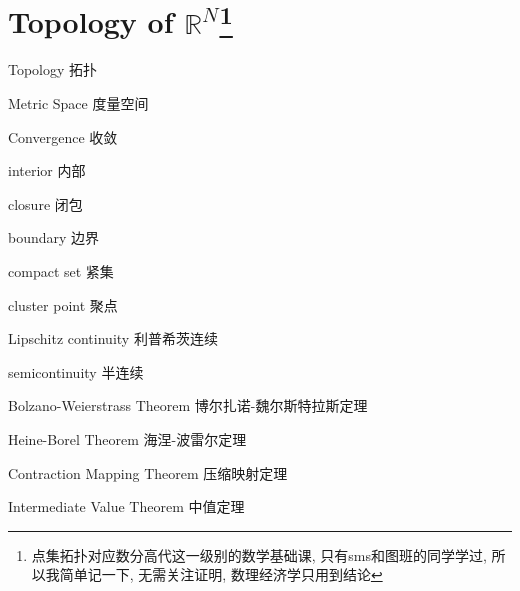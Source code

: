 \begin{comment}
    

\documentclass[lang=cn,10pt,green]{elegantbook} 
\title{2025年数理经济学笔记}
\subtitle{授课: 杨佳楠老师}

\author{徐靖}
\institute{PKU}
\date{Febuary 27, 2025}
\bioinfo{声明}{请勿用于个人学习外其他用途!}

\extrainfo{个人笔记, 如有谬误, 欢迎指正! 联系方式 : 2200012917@stu.pku.edu.cn}

\setcounter{tocdepth}{3}

\logo{logo-blue.png}
\cover{cover.jpg}

\usepackage{array}
\newcommand{\ccr}[1]{\makecell{{\color{#1}\rule{1cm}{1cm}}}}




\maketitle
\frontmatter

\tableofcontents

\mainmatter
\end{comment}
\chapter{Topology of $\mathbb{R}^N$\footnote{点集拓扑对应数分高代这一级别的数学基础课, 只有sms和图班的同学学过, 所以我简单记一下, 无需关注证明, 数理经济学只用到结论}}

\begin{introduction}[Keywords]
    \item Topology 拓扑
    \item Metric Space 度量空间
    \item Convergence 收敛
    \item interior 内部
    \item closure 闭包
    \item boundary 边界
    \item compact set 紧集
    \item cluster point 聚点
    \item Lipschitz continuity 利普希茨连续
    \item semicontinuity 半连续
    \item Bolzano-Weierstrass Theorem 博尔扎诺-魏尔斯特拉斯定理
    \item Heine-Borel Theorem 海涅-波雷尔定理
    \item Contraction Mapping Theorem 压缩映射定理
    \item Intermediate Value Theorem 中值定理
\end{introduction}

